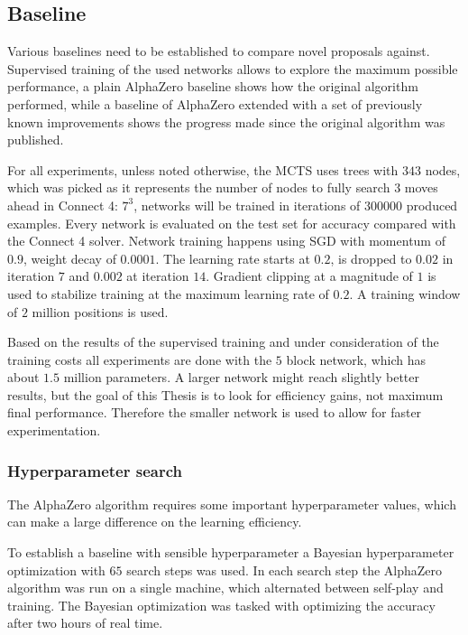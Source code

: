 \documentclass[12pt,onecolumn,oneside,titlepage]{article}
\begin{document}
\subsection{Baseline}

Various baselines need to be established to compare novel proposals against. Supervised training of the used networks allows to explore the maximum possible performance, a plain AlphaZero baseline shows how the original algorithm performed, while a baseline
of AlphaZero extended with a set of previously known improvements shows the progress made since the original algorithm was published.

For all experiments, unless noted otherwise, the MCTS uses trees with $343$ nodes, which was picked as it represents the number of nodes to fully search $3$ moves ahead in Connect 4: $7^3$,
networks will be trained in iterations of $300000$ produced examples. Every network is evaluated on the test set for accuracy compared with the Connect 4 solver.
Network training happens using SGD with momentum of $0.9$, weight decay of $0.0001$. The learning rate starts at $0.2$, is dropped to $0.02$ in iteration $7$ and $0.002$ at iteration $14$. 
Gradient clipping at a magnitude of $1$ is used to stabilize training at the maximum learning rate of $0.2$.
A training window of $2$ million positions is used.


Based on the results of the supervised training and under consideration of the training costs all experiments are done with the $5$ block network, which has about $1.5$ million parameters. A larger network might reach slightly better results,
but the goal of this Thesis is to look for efficiency gains, not maximum final performance. Therefore the smaller network is used to allow for faster experimentation.

\subsubsection{Hyperparameter search}

The AlphaZero algorithm requires some important hyperparameter values, which can make a large difference on the learning efficiency. 

To establish a baseline with sensible hyperparameter a Bayesian hyperparameter optimization with $65$ search steps was used.
In each search step the AlphaZero algorithm was run on a single machine, which alternated between self-play and training. The Bayesian optimization was tasked with optimizing the accuracy after two hours of real time. 
\end{document}
